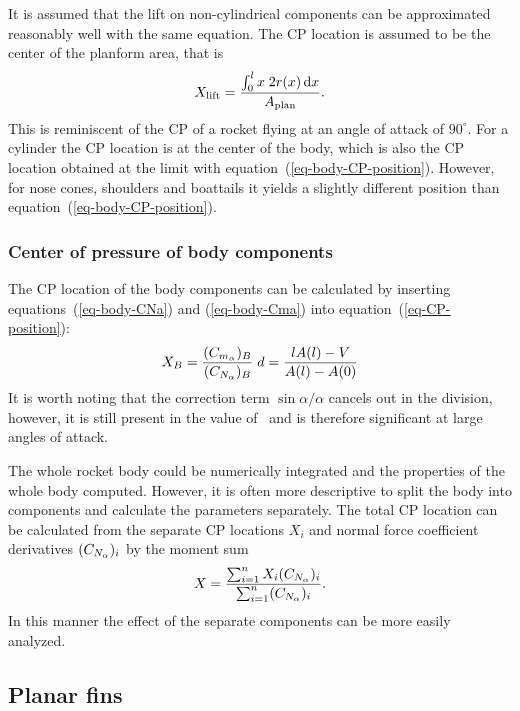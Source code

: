 It is assumed that the lift on non-cylindrical components can be
approximated reasonably well with the same equation.  The CP location
is assumed to be the center of the planform area, that is
%
\begin{equation}
X_{\rm lift} = \frac{\int_0^l x\; 2r(x)\dif x}{A_{\rm plan}}.
\end{equation}
%
This is reminiscent of the CP of a rocket flying at an angle of attack
of $90^\circ$.  For a cylinder the CP location is at the center of the
body, which is also the CP location obtained at the limit with
equation~(\ref{eq-body-CP-position}).  However, for nose cones,
shoulders and boattails it yields a slightly different position than
equation~(\ref{eq-body-CP-position}).







\subsubsection{Center of pressure of body components}

The CP location of the body components can be calculated by
inserting equations~(\ref{eq-body-CNa}) and (\ref{eq-body-Cma}) into
equation~(\ref{eq-CP-position}):
%
\begin{equation}
X_B = \frac{(C_{m_\alpha})_B}{({C_{N_\alpha}})_B}\;d
    = \frac{lA(l)-V}{A(l)-A(0)}
\label{eq-body-CP-position}
\end{equation}
%
It is worth noting that the correction term $\sin\alpha/\alpha$
cancels out in the division, however, it is still present in the
value of \CNa\ and is therefore significant at large angles of attack.

The whole rocket body could be numerically integrated and the
properties of the whole body computed.  However, it is often more
descriptive to split the body into components and calculate the
parameters separately.  The total CP location can be calculated from
the separate CP locations $X_i$ and normal force coefficient
derivatives $({C_{N_\alpha}})_i$ by the moment sum
%
\begin{equation}
X = \frac{\sum_{i=1}^n X_i({C_{N_\alpha}})_i}{\sum_{i=1}^n ({C_{N_\alpha}})_i}.
\label{eq-moment-sum}
\end{equation}
%
In this manner the effect of the separate components can be more
easily analyzed.



\subsection{Planar fins}
\label{sec-planar-fins}

